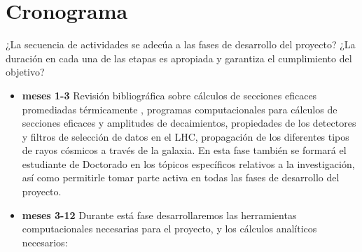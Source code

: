 \section{ Cronograma}
\begin{instrucciones}
  ¿La secuencia de actividades se adecúa a las fases de desarrollo del proyecto? ¿La duración en cada una de las etapas es apropiada y garantiza el cumplimiento del objetivo?
\end{instrucciones}


\begin{itemize}
\item \textbf{meses 1-3} Revisión bibliográfica sobre cálculos de
  secciones eficaces promediadas térmicamente , programas
  computacionales para cálculos de secciones eficaces y amplitudes de
  decaimientos, propiedades de los detectores y filtros de selección
  de datos en el LHC, propagación de los diferentes tipos de rayos
  cósmicos a través de la galaxia.  En esta fase también se formará el
  estudiante de Doctorado en los tópicos específicos relativos a la
  investigación, así como permitirle tomar parte activa en todas las
  fases de desarrollo del proyecto.

\item \textbf{meses 3-12}
  Durante está fase desarrollaremos las herramientas computacionales necesarias para el proyecto, y los cálculos analíticos necesarios:


\end{itemize}
